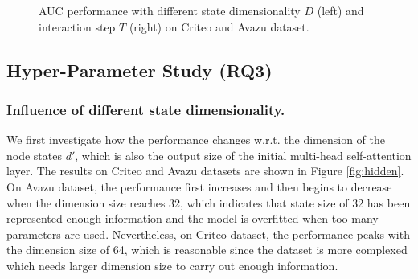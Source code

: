 \documentclass[sigconf]{acmart}
\begin{document}
\begin{figure}[t]
\centering
{}\caption{AUC performance with different state dimensionality $D$ (left) and interaction step $T$ (right) on Criteo and Avazu dataset.}
\label{fig:performance}
\vspace{-4mm}
\end{figure}


\subsection{Hyper-Parameter Study (RQ3)}

\subsubsection{\textbf{Influence of different state dimensionality.}}
We first investigate how the performance changes w.r.t. the dimension of the node states $d'$, which is also the output size of the initial multi-head self-attention layer. 
The results on Criteo and Avazu datasets are shown in Figure \ref{fig:hidden}.
On Avazu dataset, the performance first increases and then begins to decrease when the dimension size reaches 32, which indicates that state size of 32 has been represented enough information and the model is overfitted when too many parameters are used. 
Nevertheless, on Criteo dataset, the performance peaks with the dimension size of 64, which is reasonable since the dataset is more complexed which needs larger dimension size to carry out enough information.
\end{document}

